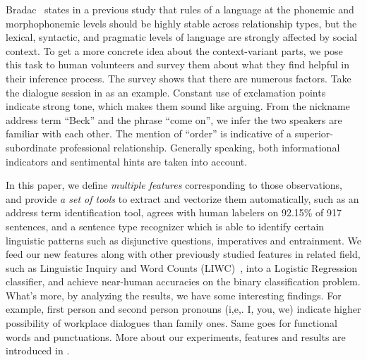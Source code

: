 Bradac~\cite{flover} states in a previous study that rules of 
a language at the phonemic and morphophonemic levels should be highly 
stable across relationship types, but the lexical, syntactic, and 
pragmatic levels of language are strongly affected by social context. 
To get a more concrete idea about the 
context-variant parts, we pose this task to human volunteers and 
survey them about what they find helpful in their inference process. 
The survey shows that there are numerous factors. 
Take the dialogue session in  as an example.
Constant use of exclamation points indicate strong tone, 
which makes them sound like arguing.
From the nickname address term ``Beck'' and the phrase ``come on'', 
we infer the two speakers are familiar with each other. 
The mention of ``order'' is indicative of a superior-subordinate 
professional relationship. 
Generally speaking, both informational indicators and sentimental 
hints are taken into account.

In this paper, we define {\em multiple features} corresponding to 
those observations, and provide {\em a set of tools} to extract and 
vectorize them automatically, such as an address term identification tool, 
agrees with human labelers on 92.15\% of 917 sentences, 
and a sentence type recognizer which is able to 
identify certain linguistic patterns such as disjunctive questions, 
imperatives and entrainment. We feed our new features along with 
other previously studied features in related field,  
such as Linguistic Inquiry and Word Counts (LIWC)~\cite{liwc}, into 
a Logistic Regression classifier, and achieve near-human accuracies on 
the binary classification problem. 
What's more, by analyzing the results, we have some interesting 
findings. For example, first person and second person pronouns 
(i,e,. I, you, we) 
indicate higher possibility of workplace dialogues than family ones. 
Same goes for functional words and punctuations. 
More about our experiments, features and results are introduced in . 

